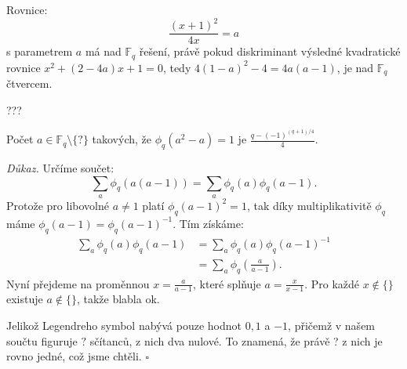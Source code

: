 \documentclass[12pt]{report}
\begin{document}
Rovnice: $$\frac{(x+1)^2}{4x} = a$$ s parametrem $a$ má nad $\mathbb{F}_q$ řešení, právě pokud diskriminant výsledné kvadratické rovnice $x^2 + (2-4a)x+1=0$, tedy $4(1-a)^2-4 = 4a(a-1)$, je nad $\mathbb{F}_q$ čtvercem.

???




\begin{veta}
Počet $a \in \mathbb{F}_q \setminus \lbrace ? \rbrace$ takových, že $\phi_q ( a^2-a) = 1$ je $\frac{q-(-1)^{(q+1)/4}}{4}$.
\end{veta}
\noindent \textit{Důkaz.} Určíme součet:
$$\sum_{a} \phi_q (a (a-1)) = \sum_{a} \phi_q (a) \phi_q (a-1).$$
Protože pro libovolné $a \neq 1$ platí $\phi_q (a-1) ^2 = 1$, tak díky multiplikativitě $\phi_q$ máme $\phi_q (a-1) = \phi_q (a-1)^{-1}$. Tím získáme:
\begin{align*}
\sum_{a} \phi_q (a) \phi_q (a-1) &=  \sum_{a} \phi_q (a) \phi_q (a-1)^{-1}\\
&= \sum_{a} \phi_q \left (\frac{a}{a-1} \right).
\end{align*}
Nyní přejdeme na proměnnou $x = \frac{a}{a-1}$, které splňuje $a = \frac{x}{x-1}$. Pro každé $x \not\in \lbrace \rbrace$ existuje $a \not\in \lbrace \rbrace$, takže blabla ok.

Jelikož Legendreho symbol nabývá pouze hodnot $0,1$ a $-1$, přičemž v našem součtu figuruje $?$ sčítanců, z nich dva nulové. To znamená, že právě ? z nich je rovno jedné, což jsme chtěli. \hfill $\square$\\
\end{document}
